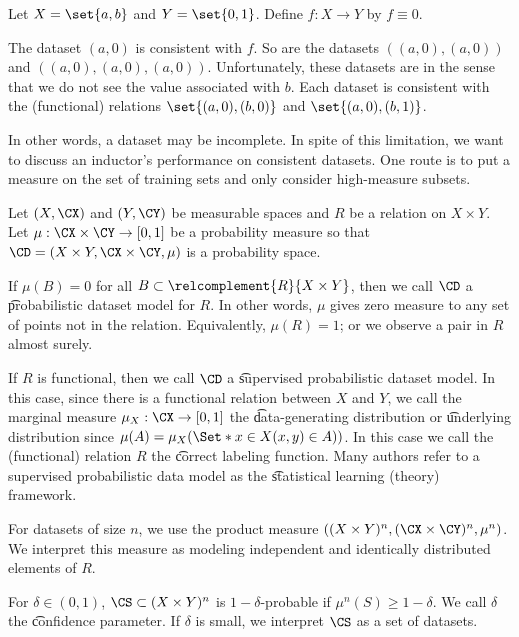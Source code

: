

Let $X = \set{a, b}$ and $Y = \set{0, 1}$. Define $f: X \to Y$ by $f \equiv 0$.

The dataset $(a, 0)$ is consistent with $f$.
So are the datasets $((a, 0), (a, 0))$ and $((a, 0), (a, 0), (a, 0))$.
Unfortunately, these datasets are  in the sense that we do not see the value associated with $b$.
Each dataset is consistent with the (functional) relations $\set{(a, 0), (b, 0)}$ and $\set{(a, 0), (b, 1)}$.

In other words, a dataset may be incomplete.
In spite of this limitation, we want to discuss an inductor's performance on consistent datasets.
One route is to put a measure on the set of training sets and only consider high-measure subsets.



Let $(X, \CX)$ and $(Y, \CY)$ be measurable spaces and $R$ be a relation on $X \times Y$.
Let $\mu: \CX \times \CY \to [0, 1]$ be a probability measure so that $\CD = (X \times Y, \CX \times \CY, \mu)$ is a probability space.

If $\mu(B) = 0$ for all $B \subset \relcomplement{R}{X \times Y}$, then we call $\CD$ a \t{probabilistic dataset model} for $R$.
In other words, $\mu$ gives zero measure to any set of points not in the relation.
Equivalently, $\mu(R) = 1$; or we observe a pair in $R$ almost surely.

If $R$ is functional, then we call $\CD$ a \t{supervised probabilistic dataset model}.
In this case, since there is a functional relation between $X$ and $Y$, we call the marginal measure $\mu_X: \CX \to [0, 1]$ the \t{data-generating distribution} or \t{underlying distribution} since $\mu(A) = \mu_X(\Set*{x \in X}{(x, y) \in A)})$.
In this case we call the (functional) relation $R$ the \t{correct labeling function}.
Many authors refer to a supervised probabilistic data model as the \t{statistical learning (theory) framework}.


For datasets of size $n$, we use the product measure $((X \times Y)^n, (\CX \times \CY)^n, \mu^n)$.
We interpret this measure as modeling independent and identically distributed elements of $R$.

For $\delta \in (0, 1)$, $\CS \subset (X \times Y)^n$ is \t{$1 - \delta$-probable}  if $\mu^n(S) \geq 1 - \delta$.
We call $\delta$ the \t{confidence parameter}.
If $\delta$ is small, we interpret $\CS$ as a set of  datasets.

